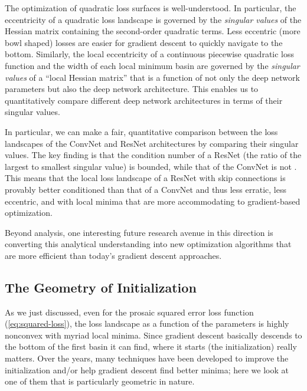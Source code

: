 \documentclass{notices}
\begin{document}

The optimization of quadratic loss surfaces is well-understood.
In particular, the eccentricity of a quadratic loss landscape is governed by the {\em singular values} of the Hessian matrix containing the second-order quadratic terms.
Less eccentric (more bowl shaped) losses are easier for gradient descent to quickly navigate to the bottom. %
Similarly, the local eccentricity of a continuous piecewise quadratic loss function and the width of each local minimum basin are governed by the {\em singular values} of a ``local Hessian matrix'' that is a function of not only the deep network parameters but also the deep network architecture.
This enables us to quantitatively compare different deep network architectures in terms of their singular values.

In particular, we can make a fair, quantitative comparison between the loss landscapes of the ConvNet and ResNet architectures by comparing their singular values. 
The key finding is that the condition number of a ResNet (the ratio of the largest to smallest singular value) is bounded, while that of the ConvNet is not \cite{rolf}.
This means that the local loss landscape of a ResNet with skip connections is provably better conditioned than that of a ConvNet and thus less erratic, less eccentric, and with local minima that are more accommodating to gradient-based optimization.

Beyond analysis, one interesting future research avenue in this direction is converting this analytical understanding into new optimization algorithms that are more efficient than today's gradient descent approaches.



\subsection*{The Geometry of Initialization }


As we just discussed, even for the prosaic squared error loss function (\ref{eq:squared-loss}), the loss landscape as a function of the parameters is highly nonconvex with myriad local minima.
Since gradient descent basically descends to the bottom of the first basin it can find, where it starts (the initialization) really matters.
Over the years, many techniques have been developed to improve the initialization and/or help gradient descent find better minima; here we look at one of them that is particularly geometric in nature.
\end{document}

